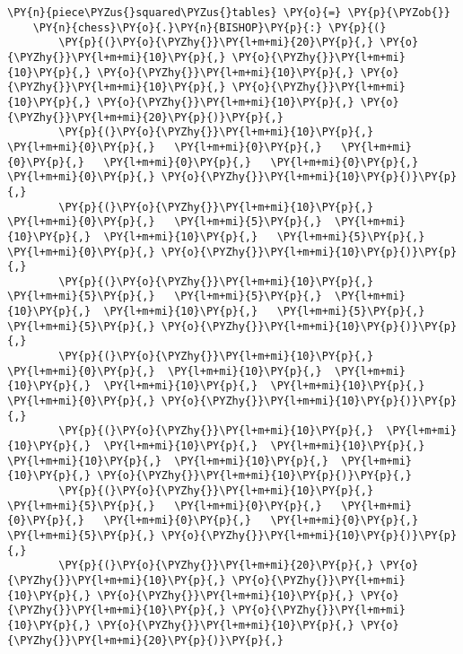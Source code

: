     \begin{tcolorbox}[fontupper=\linespread{.66}\selectfont, breakable, size=fbox, boxrule=1pt, pad at break*=1mm,colback=cellbackground, colframe=cellborder]
\begin{Verbatim}[commandchars=\\\{\}]
\PY{n}{piece\PYZus{}squared\PYZus{}tables} \PY{o}{=} \PY{p}{\PYZob{}}
    \PY{n}{chess}\PY{o}{.}\PY{n}{BISHOP}\PY{p}{:} \PY{p}{(}
        \PY{p}{(}\PY{o}{\PYZhy{}}\PY{l+m+mi}{20}\PY{p}{,} \PY{o}{\PYZhy{}}\PY{l+m+mi}{10}\PY{p}{,} \PY{o}{\PYZhy{}}\PY{l+m+mi}{10}\PY{p}{,} \PY{o}{\PYZhy{}}\PY{l+m+mi}{10}\PY{p}{,} \PY{o}{\PYZhy{}}\PY{l+m+mi}{10}\PY{p}{,} \PY{o}{\PYZhy{}}\PY{l+m+mi}{10}\PY{p}{,} \PY{o}{\PYZhy{}}\PY{l+m+mi}{10}\PY{p}{,} \PY{o}{\PYZhy{}}\PY{l+m+mi}{20}\PY{p}{)}\PY{p}{,}
        \PY{p}{(}\PY{o}{\PYZhy{}}\PY{l+m+mi}{10}\PY{p}{,}   \PY{l+m+mi}{0}\PY{p}{,}   \PY{l+m+mi}{0}\PY{p}{,}   \PY{l+m+mi}{0}\PY{p}{,}   \PY{l+m+mi}{0}\PY{p}{,}   \PY{l+m+mi}{0}\PY{p}{,}   \PY{l+m+mi}{0}\PY{p}{,} \PY{o}{\PYZhy{}}\PY{l+m+mi}{10}\PY{p}{)}\PY{p}{,}
        \PY{p}{(}\PY{o}{\PYZhy{}}\PY{l+m+mi}{10}\PY{p}{,}   \PY{l+m+mi}{0}\PY{p}{,}   \PY{l+m+mi}{5}\PY{p}{,}  \PY{l+m+mi}{10}\PY{p}{,}  \PY{l+m+mi}{10}\PY{p}{,}   \PY{l+m+mi}{5}\PY{p}{,}   \PY{l+m+mi}{0}\PY{p}{,} \PY{o}{\PYZhy{}}\PY{l+m+mi}{10}\PY{p}{)}\PY{p}{,}
        \PY{p}{(}\PY{o}{\PYZhy{}}\PY{l+m+mi}{10}\PY{p}{,}   \PY{l+m+mi}{5}\PY{p}{,}   \PY{l+m+mi}{5}\PY{p}{,}  \PY{l+m+mi}{10}\PY{p}{,}  \PY{l+m+mi}{10}\PY{p}{,}   \PY{l+m+mi}{5}\PY{p}{,}   \PY{l+m+mi}{5}\PY{p}{,} \PY{o}{\PYZhy{}}\PY{l+m+mi}{10}\PY{p}{)}\PY{p}{,}
        \PY{p}{(}\PY{o}{\PYZhy{}}\PY{l+m+mi}{10}\PY{p}{,}   \PY{l+m+mi}{0}\PY{p}{,}  \PY{l+m+mi}{10}\PY{p}{,}  \PY{l+m+mi}{10}\PY{p}{,}  \PY{l+m+mi}{10}\PY{p}{,}  \PY{l+m+mi}{10}\PY{p}{,}   \PY{l+m+mi}{0}\PY{p}{,} \PY{o}{\PYZhy{}}\PY{l+m+mi}{10}\PY{p}{)}\PY{p}{,}
        \PY{p}{(}\PY{o}{\PYZhy{}}\PY{l+m+mi}{10}\PY{p}{,}  \PY{l+m+mi}{10}\PY{p}{,}  \PY{l+m+mi}{10}\PY{p}{,}  \PY{l+m+mi}{10}\PY{p}{,}  \PY{l+m+mi}{10}\PY{p}{,}  \PY{l+m+mi}{10}\PY{p}{,}  \PY{l+m+mi}{10}\PY{p}{,} \PY{o}{\PYZhy{}}\PY{l+m+mi}{10}\PY{p}{)}\PY{p}{,}
        \PY{p}{(}\PY{o}{\PYZhy{}}\PY{l+m+mi}{10}\PY{p}{,}   \PY{l+m+mi}{5}\PY{p}{,}   \PY{l+m+mi}{0}\PY{p}{,}   \PY{l+m+mi}{0}\PY{p}{,}   \PY{l+m+mi}{0}\PY{p}{,}   \PY{l+m+mi}{0}\PY{p}{,}   \PY{l+m+mi}{5}\PY{p}{,} \PY{o}{\PYZhy{}}\PY{l+m+mi}{10}\PY{p}{)}\PY{p}{,}
        \PY{p}{(}\PY{o}{\PYZhy{}}\PY{l+m+mi}{20}\PY{p}{,} \PY{o}{\PYZhy{}}\PY{l+m+mi}{10}\PY{p}{,} \PY{o}{\PYZhy{}}\PY{l+m+mi}{10}\PY{p}{,} \PY{o}{\PYZhy{}}\PY{l+m+mi}{10}\PY{p}{,} \PY{o}{\PYZhy{}}\PY{l+m+mi}{10}\PY{p}{,} \PY{o}{\PYZhy{}}\PY{l+m+mi}{10}\PY{p}{,} \PY{o}{\PYZhy{}}\PY{l+m+mi}{10}\PY{p}{,} \PY{o}{\PYZhy{}}\PY{l+m+mi}{20}\PY{p}{)}\PY{p}{,}

\end{Verbatim}
\end{tcolorbox}
